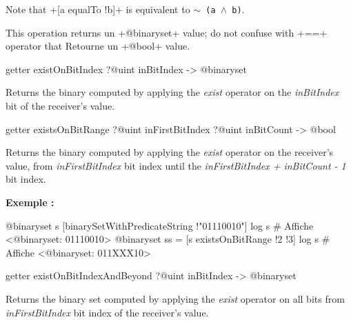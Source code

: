 Note that \ggs+[a equalTo !b]+ is equivalent to \texttt{$\sim$ (a $\wedge$ b)}.

This operation returns un \ggs+@binaryset+ value; do not confuse with \ggs+==+ operator that Retourne un \ggs+@bool+ value.








\begin{galgas}
getter existOnBitIndex ?@uint inBitIndex -> @binaryset
\end{galgas}

Returns the binary computed by applying the \emph{exist} operator on the \emph{inBitIndex} bit of the receiver's value.







\begin{galgas}
getter existsOnBitRange ?@uint inFirstBitIndex ?@uint inBitCount -> @bool
\end{galgas}


Returns the binary computed by applying the \emph{exist} operator on the receiver's value, from \emph{inFirstBitIndex} bit index until the \emph{inFirstBitIndex + inBitCount - 1} bit index.


\textbf{Exemple :}
\begin{galgas}
@binaryset s [binarySetWithPredicateString !"01110010"]
log s # Affiche <@binaryset: 01110010>
@binaryset ss = [s existsOnBitRange !2 !3]
log s # Affiche <@binaryset: 011XXX10>
\end{galgas}








\begin{galgas}
getter existOnBitIndexAndBeyond ?@uint inBitIndex -> @binaryset
\end{galgas}

Returns the binary set computed by applying the \emph{exist} operator on all bits from \emph{inFirstBitIndex} bit index of the receiver's value.








